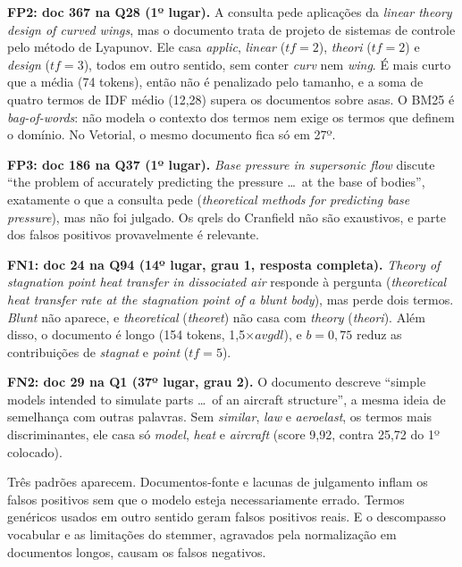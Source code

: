 \documentclass[10pt,a4paper]{article}
\newcommand{\term}[1]{\textit{#1}}      %
\begin{document}
\textbf{FP2: doc 367 na Q28 (1º lugar).} A consulta pede aplicações da \term{linear theory design of curved wings}, mas o documento trata de projeto de sistemas de controle pelo método de Lyapunov. Ele casa \term{applic}, \term{linear} ($tf=2$), \term{theori} ($tf=2$) e \term{design} ($tf=3$), todos em outro sentido, sem conter \term{curv} nem \term{wing}. É mais curto que a média (74 tokens), então não é penalizado pelo tamanho, e a soma de quatro termos de IDF médio (12,28) supera os documentos sobre asas. O BM25 é \term{bag-of-words}: não modela o contexto dos termos nem exige os termos que definem o domínio. No Vetorial, o mesmo documento fica só em 27º.

\textbf{FP3: doc 186 na Q37 (1º lugar).} \term{Base pressure in supersonic flow} discute ``the problem of accurately predicting the pressure \dots\ at the base of bodies'', exatamente o que a consulta pede (\term{theoretical methods for predicting base pressure}), mas não foi julgado. Os qrels do Cranfield não são exaustivos, e parte dos falsos positivos provavelmente é relevante.

\textbf{FN1: doc 24 na Q94 (14º lugar, grau 1, resposta completa).} \term{Theory of stagnation point heat transfer in dissociated air} responde à pergunta (\term{theoretical heat transfer rate at the stagnation point of a blunt body}), mas perde dois termos. \term{Blunt} não aparece, e \term{theoretical} (\term{theoret}) não casa com \term{theory} (\term{theori}). Além disso, o documento é longo (154 tokens, 1,5$\times avgdl$), e $b=0{,}75$ reduz as contribuições de \term{stagnat} e \term{point} ($tf=5$).

\textbf{FN2: doc 29 na Q1 (37º lugar, grau 2).} O documento descreve ``simple models intended to simulate parts \dots\ of an aircraft structure'', a mesma ideia de semelhança com outras palavras. Sem \term{similar}, \term{law} e \term{aeroelast}, os termos mais discriminantes, ele casa só \term{model}, \term{heat} e \term{aircraft} (score 9,92, contra 25,72 do 1º colocado).

Três padrões aparecem. Documentos-fonte e lacunas de julgamento inflam os falsos positivos sem que o modelo esteja necessariamente errado. Termos genéricos usados em outro sentido geram falsos positivos reais. E o descompasso vocabular e as limitações do stemmer, agravados pela normalização em documentos longos, causam os falsos negativos.
\end{document}
